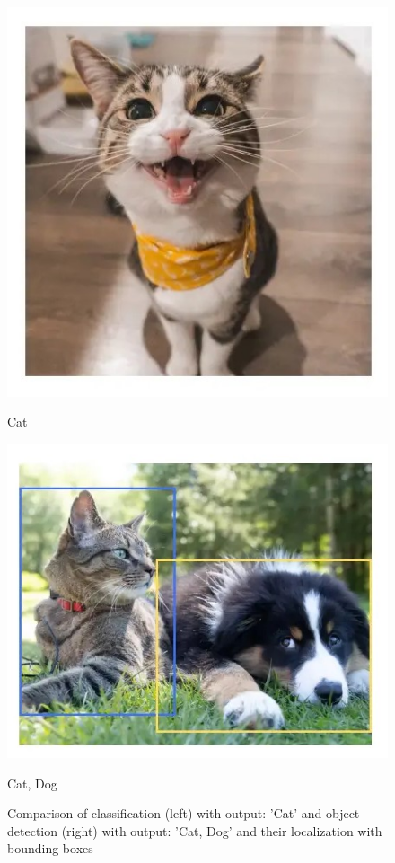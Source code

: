 \begin{figure}[ht]
	\centering
	\begin{minipage}{0.4\textwidth}
		\centering
		\includegraphics[width=0.7\linewidth]{images/cat_class.jpg}
		\caption*{Cat}
		\label{fig:justcat}
	\end{minipage}%
	\begin{minipage}{0.48\textwidth}
		\centering
		\includegraphics[width=0.7\linewidth]{images/catanddog_detect.jpg}
		\caption*{Cat, Dog}
		\label{fig:catanddog}
	\end{minipage}
	\caption{Comparison of classification (left) with output: 'Cat' and object detection (right) with output: 'Cat, Dog' and their localization with bounding boxes }
	\label{fig:both_figures_class_detect} %
\end{figure}




